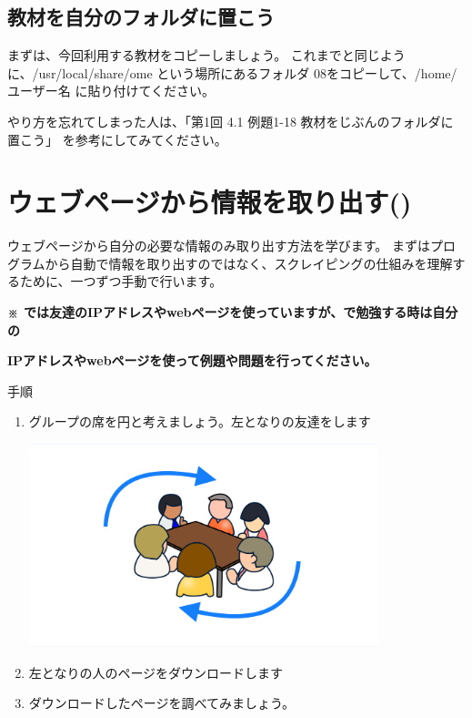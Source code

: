 \documentclass[a4paper,12pt,dvipdfmx]{jarticle}
\begin{document}
\subsection*{教材を自分のフォルダに置こう}
まずは、今回利用する教材をコピーしましょう。
これまでと同じように、/usr/local/share/ome という場所にあるフォルダ 08をコピーして、/home/ユーザー名 に貼り付けてください。

やり方を忘れてしまった人は、「第1回 4.1 例題1-18 教材をじぶんのフォルダに置こう」 を参考にしてみてください。

\bigskip


\bigskip

\clearpage\section{ウェブページから情報を取り出す()}
ウェブページから自分の必要な情報のみ取り出す方法を学びます。
まずはプログラムから自動で情報を取り出すのではなく、スクレイピングの仕組みを理解するために、一つずつ手動で行います。



\bigskip

{\bfseries\color[rgb]{1.0,0.2,0.2}
※ では友達のIPアドレスやwebページを使っていますが、で勉強する時は自分の }

{\bfseries\color[rgb]{1.0,0.2,0.2}
    IPアドレスやwebページを使って例題や問題を行ってください。}

手順
\begin{enumerate}

	\item
グループの席を円と考えましょう。左となりの友達をします


\bigskip



\begin{center}
\includegraphics[width=10.174cm,height=5.897cm]{textbook-img001.jpg}

\end{center}

\bigskip


\bigskip


\bigskip



\item
左となりの人のページをダウンロードします

\item
ダウンロードしたページを調べてみましょう。
\end{enumerate}
\end{document}
